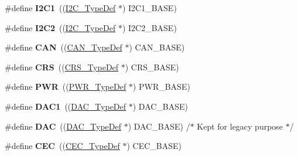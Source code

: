 \begin{DoxyCompactItemize}
\mbox{\label{group___peripheral__declaration_gab45d257574da6fe1f091cc45b7eda6cc}} 
\#define {\bfseries I2\+C1}~((\hyperlink{struct_i2_c___type_def}{I2\+C\+\_\+\+Type\+Def} $\ast$) I2\+C1\+\_\+\+B\+A\+SE)
\item 
\mbox{\label{group___peripheral__declaration_gafa60ac20c1921ef1002083bb3e1f5d16}} 
\#define {\bfseries I2\+C2}~((\hyperlink{struct_i2_c___type_def}{I2\+C\+\_\+\+Type\+Def} $\ast$) I2\+C2\+\_\+\+B\+A\+SE)
\item 
\mbox{\label{group___peripheral__declaration_ga427a40e102258055c72607bf7b604549}} 
\#define {\bfseries C\+AN}~((\hyperlink{struct_c_a_n___type_def}{C\+A\+N\+\_\+\+Type\+Def} $\ast$) C\+A\+N\+\_\+\+B\+A\+SE)
\item 
\mbox{\label{group___peripheral__declaration_gad151b2f8dbc243ac0ce1fad0c4306328}} 
\#define {\bfseries C\+RS}~((\hyperlink{struct_c_r_s___type_def}{C\+R\+S\+\_\+\+Type\+Def} $\ast$) C\+R\+S\+\_\+\+B\+A\+SE)
\item 
\mbox{\label{group___peripheral__declaration_ga04651c526497822a859942b928e57f8e}} 
\#define {\bfseries P\+WR}~((\hyperlink{struct_p_w_r___type_def}{P\+W\+R\+\_\+\+Type\+Def} $\ast$) P\+W\+R\+\_\+\+B\+A\+SE)
\item 
\mbox{\label{group___peripheral__declaration_gaffb5ff8779fa698f3c7165a617d56e4f}} 
\#define {\bfseries D\+A\+C1}~((\hyperlink{struct_d_a_c___type_def}{D\+A\+C\+\_\+\+Type\+Def} $\ast$) D\+A\+C\+\_\+\+B\+A\+SE)
\item 
\mbox{\label{group___peripheral__declaration_ga4aa2a4ab86ce00c23035e5cee2e7fc7e}} 
\#define {\bfseries D\+AC}~((\hyperlink{struct_d_a_c___type_def}{D\+A\+C\+\_\+\+Type\+Def} $\ast$) D\+A\+C\+\_\+\+B\+A\+SE) /$\ast$ Kept for legacy purpose $\ast$/
\item 
\mbox{\label{group___peripheral__declaration_ga7d03f4d873d59ff8bc76b6c9b576f3e3}} 
\#define {\bfseries C\+EC}~((\hyperlink{struct_c_e_c___type_def}{C\+E\+C\+\_\+\+Type\+Def} $\ast$) C\+E\+C\+\_\+\+B\+A\+SE)

\end{DoxyCompactItemize}
